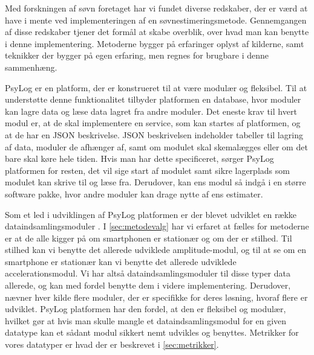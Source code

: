 Med forskningen af søvn foretaget har vi fundet diverse redskaber, der er værd at have i mente ved implementeringen af en søvnestimeringsmetode.
Gennemgangen af disse redskaber tjener det formål at skabe overblik, over hvad man kan benytte i denne implementering.
Metoderne bygger på erfaringer oplyst af kilderne, samt teknikker der bygger på egen erfaring, men regnes for brugbare i denne sammenhæng.

\begin{description}[style=nextline]
\item[PsyLog]
PsyLog er en platform, der er konstrueret til at være modulær og fleksibel.
Til at understøtte denne funktionalitet tilbyder platformen en database, hvor moduler kan lagre data og læse data lagret fra andre moduler.
Det eneste krav til hvert modul er, at de skal implementere en service, som kan startes af platformen, og at de har en JSON beskrivelse.
JSON beskrivelsen indeholder tabeller til lagring af data, moduler de afhænger af, samt om modulet skal skemalægges eller om det bare skal køre hele tiden.
Hvis man har dette specificeret, sørger PsyLog platformen for resten, det vil sige start af modulet samt sikre lagerplads som modulet kan skrive til og læse fra.
Derudover, kan ens modul så indgå i en større software pakke, hvor andre moduler kan drage nytte af ens estimater.

\item[Dataindsamlingsmoduler]
Som et led i udviklingen af PsyLog platformen er der blevet udviklet en række dataindsamlingsmoduler \citep{misc:faellesrapp}.
I \cref{sec:metodevalg} har vi erfaret at fælles for metoderne er at de alle kigger på om smartphonen er stationær og om der er stilhed. 
Til stilhed kan vi benytte det allerede udviklede amplitude-modul, og til at se om en smartphone er stationær kan vi benytte det allerede udviklede accelerationsmodul.
Vi har altså dataindsamlingsmoduler til disse typer data allerede, og kan med fordel benytte dem i videre implementering.
Derudover, nævner hver kilde flere moduler, der er specifikke for deres løsning, hvoraf flere er udviklet.
PsyLog platformen har den fordel, at den er fleksibel og modulær, hvilket gør at hvis man skulle mangle et dataindsamlingsmodul for en given datatype kan et sådant modul sikkert nemt udvikles og benyttes.
Metrikker for vores datatyper er hvad der er beskrevet i \cref{sec:metrikker}.


\end{description}
